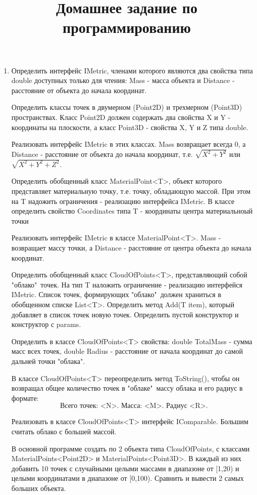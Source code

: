 \documentclass[a4paper,12pt]{article} %
\author{}
\title{Домашнее задание по программированию}
\date{}
\begin{document}
	\maketitle
	\begin{enumerate}
		\item Определить интерфейс IMetric, членами которого являются два свойства типа double доступных только для чтения: Mass - масса объекта и Distance - расстояние от объекта до начала координат.
		
		Определить классы точек в двумерном (Point2D) и трехмерном (Point3D) пространствах. Класс Point2D должен содержать два свойства X и Y - координаты на плоскости, а класс Point3D - свойства X, Y и Z типа double.
		
		Реализовать интерфейс IMetric в этих классах. Mass возвращает всегда 0, а Distance - расстояние от объекта до начала координат, т.е. $\sqrt{X^2+Y^2}$ или $\sqrt{X^2+Y^2+Z^2}$.
		
		Определить обобщенный класс MaterialPoint<T>, объект которого представляет материальную точку, т.е. точку, обладающую массой. При этом на T надожить ограничения - реализацию интерфейса IMetric. В классе определить свойство Coordinates типа T - координаты центра материальноый точки
		
		Реализовать интерфейс IMetric в классе MaterialPoint<T>. Mass - возвращает массу точки, а Distance - расстояние от центра объекта до начала координат.
		
		Определить обобщенный класс CloudOfPoints<T>, представляющий собой "облако"\ точек. На тип T наложить ограничение - реализацию интерфейся IMetric. Список точек, формирующих "облако"\ должен храниться в обобщенном списке List<T>.
		Определить метод Add(T item), который добавляет в список точек новую точек. Определить пустой конструктор и конструктор с params. 
		
		
		Определить в классе CloudOfPoints<T> свойства: double TotalMass - сумма масс всех точек, double Radius - расстояние от начала координат до самой дальней точки "облака".
		
		В классе CloudOfPoints<T> переопределить метод ToString(), чтобы он возвращал общее количество точек в "облаке"\, массу облака и его радиус в формате:
		$$\text{ Всего точек: <N>. Масса: <M>. Радиус <R>.}$$
		
		Реализовать в классе CloudOfPoints<T> интерфейс IComparable. Большим считать облако с большей массой.
		
		В основной программе создать по 2 объекта типа CloudOfPoints, с классами MaterialPoints<Point2D> и MaterialPoints<Point3D>. В каждый из них добавить 10 точек с случайными целыми массами в диапазоне от [1,20) и целыми координатами в диапазоне от [0,100). Сравнить и вывести 2 самых больших объекта.
	\end{enumerate}
\end{document}
